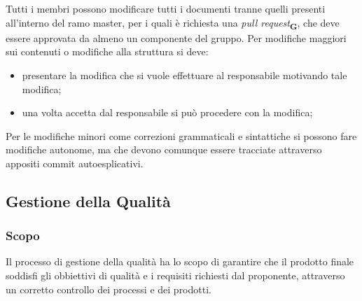         Tutti i membri possono modificare tutti i documenti tranne quelli presenti all'interno del ramo master, per i quali è richiesta una \textit{pull request}\textsubscript{\textbf{G}}, che deve essere approvata da almeno un componente del gruppo.
        Per modifiche maggiori sui contenuti o modifiche alla struttura si deve:
        \begin{itemize}
            \item presentare la modifica che si vuole effettuare al responsabile motivando tale modifica;
            \item una volta accetta dal responsabile si può procedere con la modifica; 
        \end{itemize} 
        Per le modifiche minori come correzioni grammaticali e sintattiche si possono fare modifiche autonome, ma che devono comunque essere tracciate attraverso appositi commit autoesplicativi.
    \subsection{Gestione della Qualità}
        \subsubsection{Scopo}
        Il processo di gestione della qualità ha lo scopo di garantire che il prodotto finale soddisfi gli obbiettivi di qualità e i requisiti richiesti dal proponente, attraverso un corretto controllo dei processi e dei prodotti.
